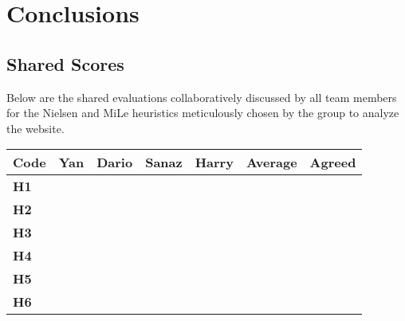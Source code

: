 \section{Conclusions}
\subsection{Shared Scores}
Below are the shared evaluations collaboratively discussed by all team members for the Nielsen and MiLe heuristics meticulously chosen by the group to analyze the website.\\
\begin{table}[htp!]
    \centering
    \begin{tabular}{ |l|c|c|c|c|c|c| }
        \hline
        \textbf{Code} & \textbf{Yan} & \textbf{Dario} & \textbf{Sanaz} & \textbf{Harry} & \textbf{Average} & \textbf{Agreed}\\
        \hline
        \textbf{H1} & \textbf{\color{unicefOrange}{3}} & \textbf{\color{unicefOrange}{3}} & \textbf{\color{unicefOrange}{3.5}} & \textbf{\color{unicefRed}{2}} & \textbf{\color{unicefRed}{2.875}} & \textbf{\color{unicefOrange}{3}}\\
        \hline
        \textbf{H2} & \textbf{\color{unicefGreen}{4}} & \textbf{\color{unicefGreen}{5}} & \textbf{\color{unicefGreen}{4}} & \textbf{\color{unicefGreen}{5}} & \textbf{\color{unicefGreen}{4.5}} & \textbf{\color{unicefGreen}{4.5}}\\
        \hline
        \textbf{H3} & \textbf{\color{unicefGreen}{4}} & \textbf{\color{unicefRed}{2}} & \textbf{\color{unicefGreen}{4}} & \textbf{\color{unicefOrange}{3}} & \textbf{\color{unicefOrange}{3.25}} & \textbf{\color{unicefOrange}{3}}\\
        \hline
        \textbf{H4} & \textbf{\color{unicefGreen}{4}} & \textbf{\color{unicefGreen}{5}} & \textbf{\color{unicefGreen}{4}} & \textbf{\color{unicefGreen}{5}} & \textbf{\color{unicefGreen}{4.5}} & \textbf{\color{unicefGreen}{4.5}}\\
        \hline
        \textbf{H5} & \textbf{\color{unicefGreen}{4}} & \textbf{\color{unicefGreen}{4}} & \textbf{\color{unicefGreen}{4.5}} & \textbf{\color{unicefGreen}{5}} & \textbf{\color{unicefGreen}{4.375}} & \textbf{\color{unicefGreen}{4.5}}\\
        \hline
        \textbf{H6} & \textbf{\color{unicefGreen}{4}} & \textbf{\color{unicefGreen}{5}} & \textbf{\color{unicefGreen}{4.5}} & \textbf{\color{unicefGreen}{4}} & \textbf{\color{unicefGreen}{4.375}} & \textbf{\color{unicefGreen}{5}}\\

\end{tabular}
\end{table}
